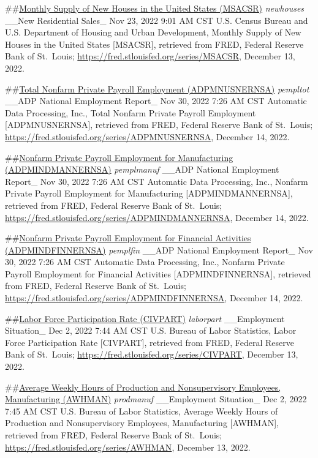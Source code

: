 \documentclass[
]{article}
\begin{document}
\#\#\href{https://fred.stlouisfed.org/series/MSACSR}{Monthly Supply of
New Houses in the United States (MSACSR)} \emph{newhouses} \_\_New
Residential Sales\_ Nov 23, 2022 9:01 AM CST U.S. Census Bureau and U.S.
Department of Housing and Urban Development, Monthly Supply of New
Houses in the United States {[}MSACSR{]}, retrieved from FRED, Federal
Reserve Bank of St.~Louis;
\url{https://fred.stlouisfed.org/series/MSACSR}, December 13, 2022.

\#\#\href{https://fred.stlouisfed.org/series/ADPMNUSNERNSA}{Total
Nonfarm Private Payroll Employment (ADPMNUSNERNSA)} \emph{pempltot}
\_\_ADP National Employment Report\_ Nov 30, 2022 7:26 AM CST Automatic
Data Processing, Inc., Total Nonfarm Private Payroll Employment
{[}ADPMNUSNERNSA{]}, retrieved from FRED, Federal Reserve Bank of
St.~Louis; \url{https://fred.stlouisfed.org/series/ADPMNUSNERNSA},
December 14, 2022.

\#\#\href{https://fred.stlouisfed.org/series/ADPMINDMANNERNSA}{Nonfarm
Private Payroll Employment for Manufacturing (ADPMINDMANNERNSA)}
\emph{pemplmanuf} \_\_ADP National Employment Report\_ Nov 30, 2022 7:26
AM CST Automatic Data Processing, Inc., Nonfarm Private Payroll
Employment for Manufacturing {[}ADPMINDMANNERNSA{]}, retrieved from
FRED, Federal Reserve Bank of St.~Louis;
\url{https://fred.stlouisfed.org/series/ADPMINDMANNERNSA}, December 14,
2022.

\#\#\href{https://fred.stlouisfed.org/series/ADPMINDFINNERNSA}{Nonfarm
Private Payroll Employment for Financial Activities (ADPMINDFINNERNSA)}
\emph{pemplfin} \_\_ADP National Employment Report\_ Nov 30, 2022 7:26
AM CST Automatic Data Processing, Inc., Nonfarm Private Payroll
Employment for Financial Activities {[}ADPMINDFINNERNSA{]}, retrieved
from FRED, Federal Reserve Bank of St.~Louis;
\url{https://fred.stlouisfed.org/series/ADPMINDFINNERNSA}, December 14,
2022.

\#\#\href{https://fred.stlouisfed.org/series/CIVPART}{Labor Force
Participation Rate (CIVPART)} \emph{laborpart} \_\_Employment
Situation\_ Dec 2, 2022 7:44 AM CST U.S. Bureau of Labor Statistics,
Labor Force Participation Rate {[}CIVPART{]}, retrieved from FRED,
Federal Reserve Bank of St.~Louis;
\url{https://fred.stlouisfed.org/series/CIVPART}, December 13, 2022.

\#\#\href{https://fred.stlouisfed.org/series/AWHMAN}{Average Weekly
Hours of Production and Nonsupervisory Employees, Manufacturing
(AWHMAN)} \emph{prodmanuf} \_\_Employment Situation\_ Dec 2, 2022 7:45
AM CST U.S. Bureau of Labor Statistics, Average Weekly Hours of
Production and Nonsupervisory Employees, Manufacturing {[}AWHMAN{]},
retrieved from FRED, Federal Reserve Bank of St.~Louis;
\url{https://fred.stlouisfed.org/series/AWHMAN}, December 13, 2022.
\end{document}
